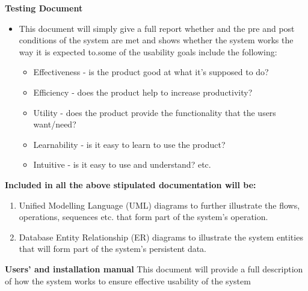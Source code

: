 \textbf{Testing Document}
    \begin{itemize}
         \item This document will simply give a full report whether and the pre and post conditions of the system are met and shows whether the system works the way it is expected to.some of the usability goals include the following: 
\newline
\begin{itemize}
        \item  Effectiveness - is the product good at what it’s supposed to do?
        \item  Efficiency - does the product help to increase productivity?
        \item  Utility - does the product provide the functionality that the users
        want/need?
        \item  Learnability - is it easy to learn to use the product?
        \item  Intuitive - is it easy to use and understand? etc.
\end{itemize}
     \end{itemize}
     
\textbf{Included in all the above stipulated documentation will be:}
\begin{enumerate}
\item Unified Modelling Language (UML) diagrams to further illustrate the
flows, operations, sequences etc. that form part of the system's
operation.
\item Database Entity Relationship (ER) diagrams to illustrate the system entities that will form part of the system's persistent data.
\end{enumerate}

\textbf{Users’ and installation manual}
\newline
This document will provide a full description of how the system works to ensure effective usability of the system
